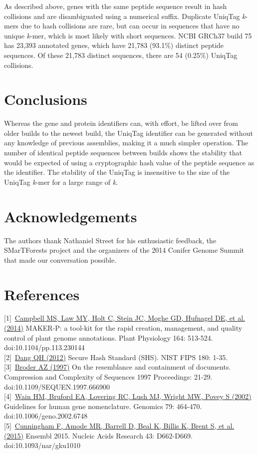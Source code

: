 \documentclass[10pt]{article}
\begin{document}
As described above, genes with the same peptide sequence result in hash
collisions and are disambiguated using a numerical suffix. Duplicate
UniqTag \emph{k}-mers due to hash collisions are rare, but can occur in
sequences that have no unique \emph{k}-mer, which is most likely with
short sequences. NCBI GRCh37 build 75 has 23,393 annotated genes, which
have 21,783 (93.1\%) distinct peptide sequences. Of these 21,783
distinct sequences, there are 54 (0.25\%) UniqTag collisions.

\section{Conclusions}\label{conclusions}

Whereas the gene and protein identifiers can, with effort, be lifted
over from older builds to the newest build, the UniqTag identifier can
be generated without any knowledge of previous assemblies, making it a
much simpler operation. The number of identical peptide sequences
between builds shows the stability that would be expected of using a
cryptographic hash value of the peptide sequence as the identifier. The
stability of the UniqTag is insensitive to the size of the UniqTag
\emph{k}-mer for a large range of \emph{k}.

\section{Acknowledgements}\label{acknowledgements}

The authors thank Nathaniel Street for his enthusiastic feedback, the
SMarTForests project and the organizers of the 2014 Conifer Genome
Summit that made our conversation possible.

\section{References}\label{references}

{[}1{]}~\href{http://dx.doi.org/10.1104/pp.113.230144}{Campbell MS, Law
MY, Holt C, Stein JC, Moghe GD, Hufnagel DE, et al. (2014)} MAKER-P: a
tool-kit for the rapid creation, management, and quality control of
plant genome annotations. Plant Physiology 164: 513-524.
doi:10.1104/pp.113.230144\\{[}2{]}~\href{http://www.nist.gov/manuscript-publication-search.cfm?pub_id=910977}{Dang
QH (2012)} Secure Hash Standard (SHS). NIST FIPS 180:
1-35.\\{[}3{]}~\href{http://dx.doi.org/10.1109/SEQUEN.1997.666900}{Broder
AZ (1997)} On the resemblance and containment of documents. Compression
and Complexity of Sequences 1997 Proceedings: 21-29.
doi:10.1109/SEQUEN.1997.666900\\{[}4{]}~\href{http://dx.doi.org/10.1006/geno.2002.6748}{Wain
HM, Bruford EA, Lovering RC, Lush MJ, Wright MW, Povey S (2002)}
Guidelines for human gene nomenclature. Genomics 79: 464-470.
doi:10.1006/geno.2002.6748\\{[}5{]}~\href{http://dx.doi.org/10.1093/nar/gku1010}{Cunningham
F, Amode MR, Barrell D, Beal K, Billis K, Brent S, et al. (2015)}
Ensembl 2015. Nucleic Acids Research 43: D662-D669.
doi:10.1093/nar/gku1010
\end{document}
